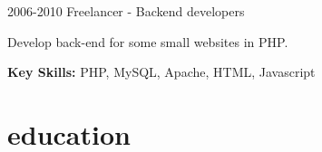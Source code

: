 \documentclass[]{friggeri-cv} %
\begin{document}
\begin{entrylist}

\entry
{2006-2010}
{Freelancer - Backend developers}
{}
{
Develop back-end for some small websites in PHP.  

\textbf{Key Skills: }
PHP, MySQL, Apache, HTML, Javascript

%
}


%
%


\end{entrylist}


\section{education}
\end{document}
